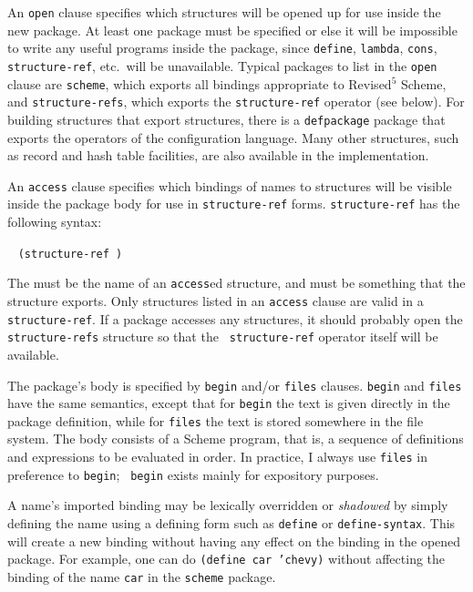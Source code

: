 An {\tt open} clause specifies which structures will be opened up for
use inside the new package.  At least one package must be specified or
else it will be impossible to write any useful programs inside the
package, since {\tt define}, {\tt lambda}, {\tt cons}, {\tt
structure-ref}, etc.\ will be unavailable.  Typical packages to list
in the {\tt open} clause are {\tt scheme}, which exports all bindings
appropriate to Revised$^5$ Scheme, and {\tt structure-refs}, which
exports the {\tt structure-ref} operator (see below).  For building
structures that export structures, there is a {\tt defpackage} package
that exports the operators of the configuration language.  Many other
structures, such as record and hash table facilities, are also
available in the \hack{} implementation.

An {\tt access} clause specifies which bindings of names to structures
will be visible inside the package body for use in {\tt structure-ref}
forms.  {\tt structure-ref} has the following syntax:
\begin{tabbing}
\qquad {} \goesto{}~
   \tt(structure-ref  )
\end{tabbing}
The  must be the name of an {\tt access}ed structure,
and  must be something that the structure exports.  Only
structures listed in an {\tt access} clause are valid in a {\tt
structure-ref}.  If a package accesses any structures, it should
probably open the {\tt structure-refs} structure so that the {\tt
structure-ref} operator itself will be available.

The package's body is specified by {\tt begin} and/or {\tt files}
clauses.  {\tt begin} and {\tt files} have the same semantics, except
that for {\tt begin} the text is given directly in the package
definition, while for {\tt files} the text is stored somewhere in the
file system.  The body consists of a Scheme program, that is, a
sequence of definitions and expressions to be evaluated in order.  In
practice, I always use {\tt files} in preference to {\tt begin}; {\tt
begin} exists mainly for expository purposes.

A name's imported binding may be lexically overridden or {\em shadowed}
by simply defining the name using a defining form such as {\tt define}
or {\tt define-syntax}.  This will create a new binding without having
any effect on the binding in the opened package.  For example, one can
do {\tt(define car 'chevy)} without affecting the binding of the name
{\tt car} in the {\tt scheme} package.

